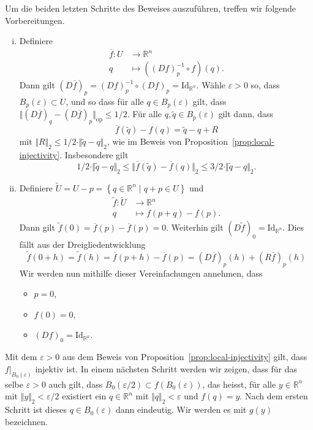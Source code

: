 \documentclass[../main.tex]{subfiles}
\begin{document}
Um die beiden letzten Schritte des Beweises auszuführen,
treffen wir folgende Vorbereitungen.
\begin{enumerate}[(i)]
  \item Definiere
    \begin{align*}
      \overline f \colon U & \to \mathbb{R}^n \\
      q & \mapsto ({(Df)}_p^{-1} \circ f)(q).
    \end{align*}
    Dann gilt ${(D \overline f)}_p = {(Df)}_p^{-1} \circ {(Df)}_p 
    = \text{Id}_{\mathbb{R}^n}$.
    Wähle $\varepsilon > 0$ so, dass $B_p(\varepsilon) \subset U$,
    und so dass für alle $q \in B_p(\varepsilon)$ gilt, dass
    \(
      \Vert {(D \overline f)}_q - {(D \overline f)}_p \Vert_{\text{op}}
        \leq 1/2
    \).
    Für alle $q, \widetilde q \in B_p(\varepsilon)$ gilt dann, dass
    \[
      \overline f ( \widetilde q ) - f(q) = \widetilde q - q + R
    \]
    mit $\Vert R \Vert_2 \leq 1/2 \cdot \Vert \widetilde q - q \Vert_2$,
    wie im Beweis von Proposition~\ref{prop:local-injectivity}.
    Insbesondere gilt
    \[
      1/2 \cdot \Vert \widetilde q - q \Vert_2 \leq
      \Vert \overline f ( \widetilde q ) - \overline f (q) \Vert_2
      \leq 3/2 \cdot \Vert \widetilde q - q \Vert_2.
    \]
  \item Definiere $\widetilde U = U - p
    = \left\{q \in \mathbb{R}^n \mid q + p \in U\right\}$
    und 
    \begin{align*}
      \widetilde f \colon \widetilde U & \to \mathbb{R}^n \\
      q & \mapsto f(p + q) - f(p).
    \end{align*}
    Dann gilt $\widetilde f ( 0 ) = \overline f(p) - \overline f (p) = 0$.
    Weiterhin gilt ${(D\widetilde f )}_0 = \text{Id}_{\mathbb{R}^n}$.
    Dies fällt aus der Dreigliedentwicklung
    \[
      \widetilde f ( 0 + h ) = \widetilde f (h)
      = \overline f ( p + h ) - \overline f ( p )
      = {(D \overline f )}_p(h) + {(R \overline f)}_p (h)
    \]
    Wir werden nun mithilfe dieser Vereinfachungen annehmen,
    dass
    \begin{itemize}
      \item $p = 0$,
      \item $f(0) = 0$,
      \item ${(Df)}_0 = \text{Id}_{\mathbb{R}^n}$.
    \end{itemize}
\end{enumerate}

Mit dem $\varepsilon > 0$ aus dem Beweis von
Proposition~\ref{prop:local-injectivity} gilt,
dass
$f |_{B_0(\varepsilon)}$ injektiv ist.
In einem nächsten Schritt werden wir zeigen,
dass für das selbe $\varepsilon > 0$ auch gilt,
dass $B_0(\varepsilon/2) \subset f(B_0(\varepsilon))$,
das heisst, für alle $y \in \mathbb{R}^n$ 
mit $\Vert y \Vert_2 < \varepsilon/2$ existiert
ein $q \in \mathbb{R}^n$ mit $\Vert q \Vert_2 < \varepsilon$ 
und $f(q) = y$.
Nach dem ersten Schritt ist dieses $q \in B_0(\varepsilon)$ 
dann eindeutig. Wir werden es mit $g(y)$ bezeichnen.
\end{document}
